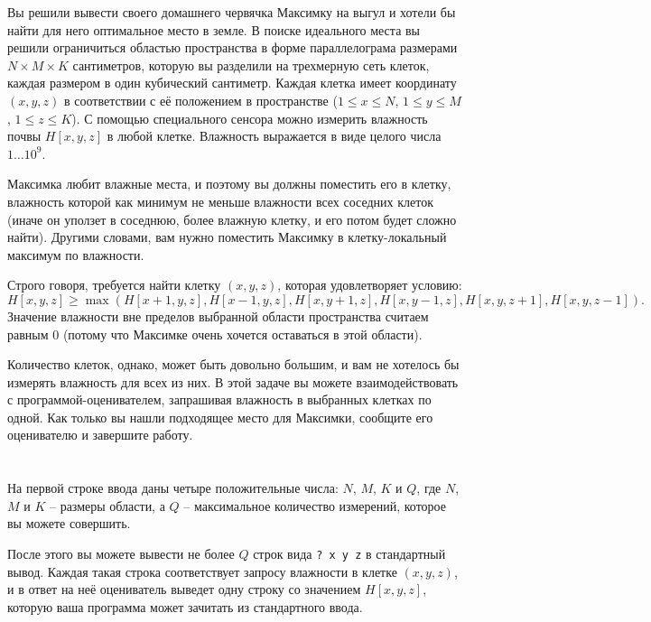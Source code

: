 \ifx\boi\undefined\fi
\def\version{jury-1}

Вы решили вывести своего домашнего червячка Максимку на выгул и хотели бы найти для него оптимальное место в земле. В поиске идеального места вы решили ограничиться областью пространства в форме параллелограма размерами $N \times M \times K$ сантиметров, которую вы разделили на трехмерную сеть клеток, каждая размером в один кубический сантиметр. Каждая клетка имеет координату $(x,y,z)$ в соответствии с её положением в пространстве ($1 \le x \le N$, $1 \le y \le M$, $1 \le z \le K$). С помощью специального сенсора можно измерить влажность почвы $H[x,y,z]$ в любой клетке. Влажность выражается в виде целого числа $1 \dots 10^9$.

Максимка любит влажные места, и поэтому вы должны поместить его в клетку, влажность которой как минимум не меньше влажности всех соседних клеток (иначе он уползет в соседнюю, более влажную клетку, и его потом будет сложно найти). Другими словами, вам нужно поместить Максимку в клетку-локальный максимум по влажности.

Строго говоря, требуется найти клетку $(x,y,z)$, которая удовлетворяет условию:
$$
H[x,y,z] \ge \max(H[x+1,y,z], H[x-1,y,z], H[x,y+1,z], H[x,y-1,z], H[x,y,z+1], H[x,y,z-1]).
$$
Значение влажности вне пределов выбранной области пространства считаем равным $0$ (потому что Максимке очень хочется оставаться в этой области).

Количество клеток, однако, может быть довольно большим, и вам не хотелось бы измерять влажность для всех из них. В этой задаче вы можете взаимодействовать с программой-оценивателем, запрашивая влажность в выбранных клетках по одной. Как только вы нашли подходящее место для Максимки, сообщите его оценивателю и завершите работу.

\section*{\interactivity}
На первой строке ввода даны четыре положительные числа: $N$, $M$, $K$ и $Q$, где $N$, $M$ и $K$ -- размеры области, а $Q$ -- максимальное количество измерений, которое вы можете совершить.

После этого вы можете вывести не более $Q$ строк вида \texttt{?\ x y z} в стандартный вывод.
Каждая такая строка соответствует запросу влажности в клетке $(x, y, z)$, и в ответ на неё оцениватель выведет одну строку со значением $H[x,y,z]$, которую ваша программа может зачитать из стандартного ввода.

